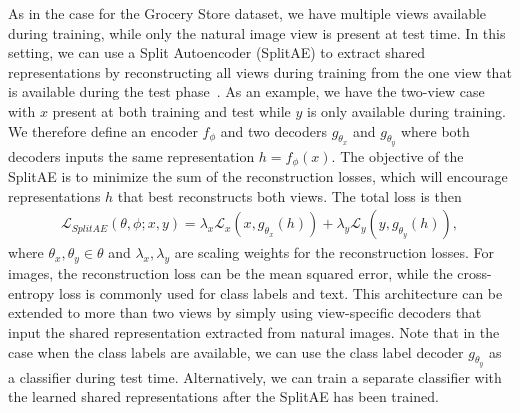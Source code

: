 As in the case for the Grocery Store dataset, we have multiple views available during training, while only the natural image view is present at test time. In this setting, we can use a Split Autoencoder (SplitAE) to extract shared representations by reconstructing all views during training from the one view that is available during the test phase~\cite{ngiam2011multimodal, wang2015deep}. As an example, we have the two-view case with $x$ present at both training and test while $y$ is only available during training. We therefore define an encoder $f_{\phi}$ and two decoders $g_{\theta_{x}}$ and $g_{\theta_{y}}$ where both decoders inputs the same representation $h = f_{\phi}(x)$. The objective of the SplitAE is to minimize the sum of the reconstruction losses, which will encourage representations $h$ that best reconstructs both views. The total loss is then 
\begin{align}\label{eq:splitae_objective}
    \mathcal{L}_{SplitAE}(\theta, \phi; x, y) = \lambda_{x} \mathcal{L}_{x}(x, g_{\theta_{x}}(h)) + \lambda_{y} \mathcal{L}_{y}(y, g_{\theta_{y}}(h)) ,
\end{align}
where $\theta_{x}, \theta_{y} \in \theta$ and $\lambda_{x}, \lambda_{y}$ are scaling weights for the reconstruction losses.
For images, the reconstruction loss can be the mean squared error, while the cross-entropy loss is commonly used for class labels and text. This architecture can be extended to more than two views by simply using view-specific decoders that input the shared representation extracted from natural images. Note that in the case when the class labels are available, we can use the class label decoder $g_{\theta_{y}}$ as a classifier during test time. Alternatively, we can train a separate classifier with the learned shared representations after the SplitAE has been trained.


